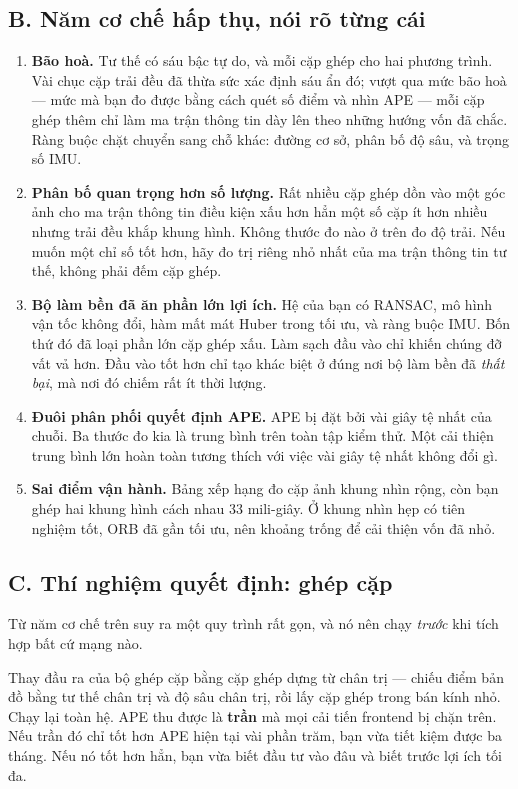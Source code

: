 \documentclass[../../deep_learning.tex]{subfiles}
\begin{document}
\subsection{B. Năm cơ chế hấp thụ, nói rõ từng cái}
\begin{enumerate}
\item \textbf{Bão hoà.} Tư thế có sáu bậc tự do, và mỗi cặp ghép cho hai phương trình. Vài chục cặp trải đều đã thừa sức xác định sáu ẩn đó; vượt qua mức bão hoà --- mức mà bạn đo được bằng cách quét số điểm và nhìn APE --- mỗi cặp ghép thêm chỉ làm ma trận thông tin dày lên theo những hướng vốn đã chắc. Ràng buộc chặt chuyển sang chỗ khác: đường cơ sở, phân bố độ sâu, và trọng số IMU.
\item \textbf{Phân bố quan trọng hơn số lượng.} Rất nhiều cặp ghép dồn vào một góc ảnh cho ma trận thông tin điều kiện xấu hơn hẳn một số cặp ít hơn nhiều nhưng trải đều khắp khung hình. Không thước đo nào ở trên đo độ trải. Nếu muốn một chỉ số tốt hơn, hãy đo trị riêng nhỏ nhất của ma trận thông tin tư thế, không phải đếm cặp ghép.
\item \textbf{Bộ làm bền đã ăn phần lớn lợi ích.} Hệ của bạn có RANSAC, mô hình vận tốc không đổi, hàm mất mát Huber trong tối ưu, và ràng buộc IMU. Bốn thứ đó đã loại phần lớn cặp ghép xấu. Làm sạch đầu vào chỉ khiến chúng đỡ vất vả hơn. Đầu vào tốt hơn chỉ tạo khác biệt ở đúng nơi bộ làm bền đã \emph{thất bại}, mà nơi đó chiếm rất ít thời lượng.
\item \textbf{Đuôi phân phối quyết định APE.} APE bị đặt bởi vài giây tệ nhất của chuỗi. Ba thước đo kia là trung bình trên toàn tập kiểm thử. Một cải thiện trung bình lớn hoàn toàn tương thích với việc vài giây tệ nhất không đổi gì.
\item \textbf{Sai điểm vận hành.} Bảng xếp hạng đo cặp ảnh khung nhìn rộng, còn bạn ghép hai khung hình cách nhau 33 mili-giây. Ở khung nhìn hẹp có tiên nghiệm tốt, ORB đã gần tối ưu, nên khoảng trống để cải thiện vốn đã nhỏ.
\end{enumerate}

\subsection{C. Thí nghiệm quyết định:  ghép cặp}
Từ năm cơ chế trên suy ra một quy trình rất gọn, và nó nên chạy \emph{trước} khi tích hợp bất cứ mạng nào.

Thay đầu ra của bộ ghép cặp bằng cặp ghép dựng từ chân trị --- chiếu điểm bản đồ bằng tư thế chân trị và độ sâu chân trị, rồi lấy cặp ghép trong bán kính nhỏ. Chạy lại toàn hệ. APE thu được là \textbf{trần} mà mọi cải tiến frontend bị chặn trên. Nếu trần đó chỉ tốt hơn APE hiện tại vài phần trăm, bạn vừa tiết kiệm được ba tháng. Nếu nó tốt hơn hẳn, bạn vừa biết đầu tư vào đâu và biết trước lợi ích tối đa.
\end{document}

